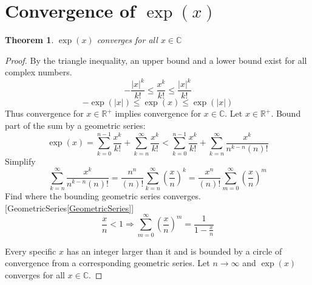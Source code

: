 \documentclass[]{article}
\newcommand{\pqty}[1]{{\left(#1\right)}}
\newcommand{\abs}[1]{{\left\lvert#1\right\rvert}}
\newtheorem{theorem}{Theorem}[section]
\numberwithin{equation}{section}
\begin{document}
	\section{Convergence of \(\exp(x)\)}
	\begin{theorem}
		\(\exp\pqty{x}\) converges for all \(x\in\mathbb{C}\)
	\end{theorem}
	\begin{proof}
		By the triangle inequality, an upper bound and a lower bound exist for all complex numbers.
		\begin{equation}
		-\frac{\abs{x}^k}{k!}\leq
		\frac{x^k}{k!}\leq
		\frac{\abs{x}^k}{k!}
		\end{equation}
		\begin{equation}
		-\exp\pqty{\abs{x}}\leq
		\exp\pqty{x}\leq
		\exp\pqty{\abs{x}}
		\end{equation}
		Thus convergence for \(x\in\mathbb{R}^+\) implies convergence for \(x\in\mathbb{C}\). Let \(x\in\mathbb{R}^+\). Bound part of the sum by a geometric series:
		\begin{equation}
		\exp\pqty{x}
		=\sum_{k=0}^{n-1}\frac{x^k}{k!}
		+\sum_{k=n}^{\infty}\frac{x^k}{k!}
		<\sum_{k=0}^{n-1}\frac{x^k}{k!}
		+\sum_{k=n}^{\infty}\frac{x^k}{n^{k-n}\pqty{n}!}
		\end{equation}
		Simplify
		\begin{equation}
		\sum_{k=n}^{\infty}\frac{x^k}{n^{k-n}\pqty{n}!}
		=\frac{n^{n}}{\pqty{n}!}\sum_{k=n}^{\infty}\pqty{\frac{x}{n}}^k
		=\frac{x^{n}}{\pqty{n}!}\sum_{m=0}^{\infty}\pqty{\frac{x}{n}}^{m}
		\end{equation}
		Find where the bounding geometric series converges. [GeometricSeries\eqref{GeometricSeries}]
		\begin{equation}
		\frac{x}{n}<1
		\Rightarrow
		\sum_{m=0}^{\infty}\pqty{\frac{x}{n}}^{m}
		=\frac{1}{1-\frac{x}{n}}
		\end{equation}
		
		Every specific \(x\) has an integer larger than it and is bounded by a circle of convergence from a corresponding geometric series. Let \(n\to\infty\) and \(\exp\pqty{x}\) converges for all \(x\in\mathbb{C}\).
	\end{proof}
\end{document}
